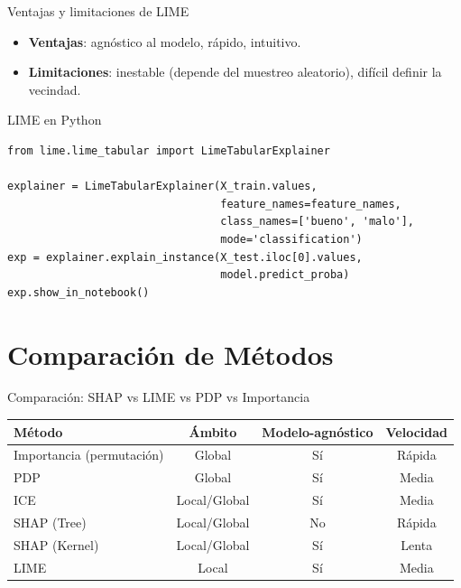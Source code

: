 \documentclass[aspectratio=169, 10pt, xcolor=table]{beamer}
\begin{document}
\begin{frame}{Ventajas y limitaciones de LIME}
    \begin{itemize}
        \item \textbf{Ventajas}: agnóstico al modelo, rápido, intuitivo.
        \item \textbf{Limitaciones}: inestable (depende del muestreo aleatorio), difícil definir la vecindad.
    \end{itemize}
\end{frame}

\begin{frame}[fragile]{LIME en Python}
    \begin{lstlisting}
from lime.lime_tabular import LimeTabularExplainer

explainer = LimeTabularExplainer(X_train.values,
                                 feature_names=feature_names,
                                 class_names=['bueno', 'malo'],
                                 mode='classification')
exp = explainer.explain_instance(X_test.iloc[0].values,
                                 model.predict_proba)
exp.show_in_notebook()
    \end{lstlisting}
\end{frame}

\section{Comparación de Métodos}

\begin{frame}{Comparación: SHAP vs LIME vs PDP vs Importancia}
    \begin{table}
        \centering
        \begin{tabular}{l|c|c|c}
            \toprule
            \textbf{Método} & \textbf{Ámbito} & \textbf{Modelo-agnóstico} & \textbf{Velocidad} \\
            \midrule
            Importancia (permutación) & Global & Sí & Rápida \\
            PDP & Global & Sí & Media \\
            ICE & Local/Global & Sí & Media \\
            SHAP (Tree) & Local/Global & No & Rápida \\
            SHAP (Kernel) & Local/Global & Sí & Lenta \\
            LIME & Local & Sí & Media \\
            \bottomrule
        \end{tabular}
    \end{table}
\end{frame}
\end{document}
